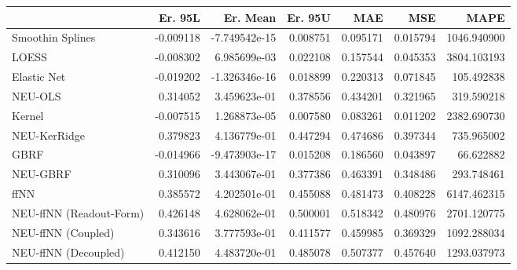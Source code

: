 \begin{tabular}{lrrrrrr}
\toprule
{} &   Er. 95L &      Er. Mean &   Er. 95U &       MAE &       MSE &         MAPE \\
\midrule
Smoothin Splines        & -0.009118 & -7.749542e-15 &  0.008751 &  0.095171 &  0.015794 &  1046.940900 \\
LOESS                   & -0.008302 &  6.985699e-03 &  0.022108 &  0.157544 &  0.045353 &  3804.103193 \\
Elastic Net             & -0.019202 & -1.326346e-16 &  0.018899 &  0.220313 &  0.071845 &   105.492838 \\
NEU-OLS                 &  0.314052 &  3.459623e-01 &  0.378556 &  0.434201 &  0.321965 &   319.590218 \\
Kernel                  & -0.007515 &  1.268873e-05 &  0.007580 &  0.083261 &  0.011202 &  2382.690730 \\
NEU-KerRidge            &  0.379823 &  4.136779e-01 &  0.447294 &  0.474686 &  0.397344 &   735.965002 \\
GBRF                    & -0.014966 & -9.473903e-17 &  0.015208 &  0.186560 &  0.043897 &    66.622882 \\
NEU-GBRF                &  0.310096 &  3.443067e-01 &  0.377386 &  0.463391 &  0.348486 &   293.748461 \\
ffNN                    &  0.385572 &  4.202501e-01 &  0.455088 &  0.481473 &  0.408228 &  6147.462315 \\
NEU-ffNN (Readout-Form) &  0.426148 &  4.628062e-01 &  0.500001 &  0.518342 &  0.480976 &  2701.120775 \\
NEU-ffNN (Coupled)      &  0.343616 &  3.777593e-01 &  0.411577 &  0.459985 &  0.369329 &  1092.288034 \\
NEU-ffNN (Decoupled)    &  0.412150 &  4.483720e-01 &  0.485078 &  0.507377 &  0.457640 &  1293.037973 \\
\bottomrule
\end{tabular}
